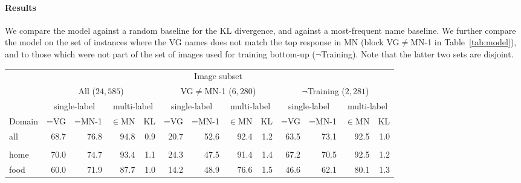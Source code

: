 \paragraph{Results} 
We compare the model against a random baseline for the KL divergence, and against a most-frequent name baseline. 
We further compare the model on the set of instances where the VG names does not match the top response in MN (block \mbox{VG$\neq$MN-1} in Table~\ref{tab:model}), and to those which were not part of the set of images used for training bottom-up ($\neg$Training).
Note that the latter two sets are disjoint. 
%
\begin{table*}
	\centering
	\small
\begin{tabular}{l@{~}|@{~}r@{~}r@{~}rr@{~}|@{~}r@{~}r@{~}rr@{~}|@{~}r@{~}r@{~}rr}
	\toprule
		& \multicolumn{12}{c}{Image subset} \\
		&	\multicolumn{4}{c}{All ($24,585$)} 
		& \multicolumn{4}{c}{VG$\neq$MN-1 ($6,280$)}
		& \multicolumn{4}{c}{$\neg$Training ($2,281$)} \\
	\midrule
			 &  \multicolumn{2}{c}{single-label}
			 &  \multicolumn{2}{c}{multi-label}
			 &  \multicolumn{2}{c}{single-label}
			 &  \multicolumn{2}{c}{multi-label}
			 &  \multicolumn{2}{c}{single-label}
			 &  \multicolumn{2}{c}{multi-label} \\
		Domain	 &  =VG & =MN-1 & $\in$MN  &  KL
		&  =VG & =MN-1 & $\in$MN  & KL
		&  =VG & =MN-1 & $\in$MN  & KL\\
\midrule
all            &               68.7 &                 76.8 &                   94.8 &            0.9 &            20.7 &              52.6 &                92.4 &         1.2 &             63.5 &               73.1 &                 92.5 &          1.0 \\ \\
home           &               70.0 &                 74.7 &                   93.4 &            1.1 &            24.3 &              47.5 &                91.4 &         1.4 &             67.2 &               70.5 &                 92.5 &          1.2 \\
food           &               60.0 &                 71.9 &                   87.7 &            1.0 &            14.2 &              48.9 &                76.6 &         1.5 &             46.6 &               62.1 &                 80.1 &          1.3 \\

\end{tabular}
\end{table*}
